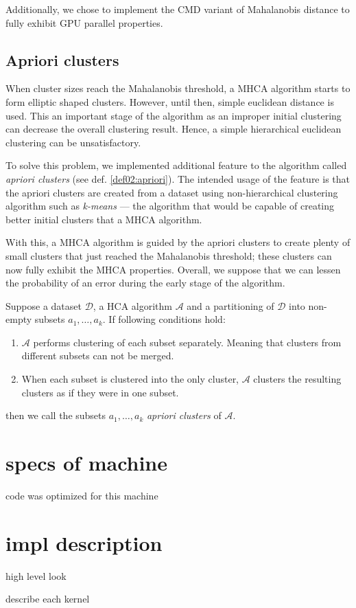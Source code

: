 Additionally, we chose to implement the CMD variant of Mahalanobis distance to fully exhibit GPU parallel properties.

\subsection{Apriori clusters}

When cluster sizes reach the Mahalanobis threshold, a MHCA algorithm starts to form elliptic shaped clusters. However, until then, simple euclidean distance is used. This an important stage of the algorithm as an improper initial clustering can decrease the overall clustering result. Hence, a simple hierarchical euclidean clustering can be unsatisfactory.

To solve this problem, we implemented additional feature to the algorithm called \emph{apriori clusters} (see def. \ref{def02:apriori}). The intended usage of the feature is that the apriori clusters are created from a dataset using non-hierarchical clustering algorithm such as \emph{k-means} --- the algorithm that would be capable of creating better initial clusters that a MHCA algorithm. 

With this, a MHCA algorithm is guided by the apriori clusters to create plenty of small clusters that just reached the Mahalanobis threshold; these clusters can now fully exhibit the MHCA properties. Overall, we suppose that we can lessen the probability of an error during the early stage of the algorithm.

\begin{defn}
	Suppose a dataset $\mathcal{D}$, a HCA algorithm $\mathcal{A}$ and a partitioning of  $\mathcal{D}$ into non-empty subsets $a_1,\dots,a_k$. If following conditions hold:
	\begin{enumerate}
		\item $\mathcal{A}$ performs clustering of each subset separately. Meaning that clusters from different subsets can not be merged.
		\item When each subset is clustered into the only cluster, $\mathcal{A}$ clusters the resulting clusters as if they were in one subset.
	\end{enumerate}
	then we call the subsets $a_1,\dots,a_k$ \emph{apriori clusters} of $\mathcal{A}$.
	
	\label{def02:apriori}
\end{defn}

\section{specs of machine}

code was optimized for this machine

\section{impl description} 

high level look

describe each kernel 
